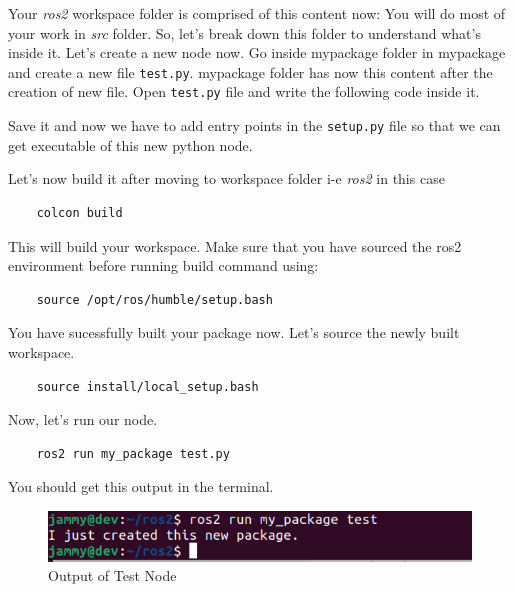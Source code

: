 \documentclass{article}
\begin{document}
Your \textit{ros2} workspace folder is comprised of this content now:
\vspace{12pt}
\vspace{12pt}
You will do most of your work in \textit{src} folder. So, let's break down this folder to understand what's inside it.
\vspace{12pt}
\vspace{12pt}
Let's create a new node now. Go inside my\textunderscore package folder in my\textunderscore package and create a new file \texttt{test.py}.
my\textunderscore package folder has now this content after the creation of new file.
\vspace{12pt}
\vspace{12pt}
Open \texttt{test.py} file and write the following code inside it.
\pagebreak

Save it and now we have to add entry points in the \texttt{setup.py} file so that we can get executable of this new python node.

Let's now build it after moving to workspace folder i-e \textit{ros2} in this case
\begin{verbatim}
    colcon build
\end{verbatim}
This will build your workspace. Make sure that you have sourced the ros2 environment before running build command using:
 \begin{verbatim}
    source /opt/ros/humble/setup.bash
\end{verbatim}
You have sucessfully built your package now. Let's source the newly built workspace.
\begin{verbatim}
    source install/local_setup.bash
\end{verbatim}
Now, let's run our node.
\begin{verbatim}
    ros2 run my_package test.py
\end{verbatim}
You should get this output in the terminal.
\begin{figure}[h]
    \includegraphics[width=12cm]{./data/images/pic1.png}
    \centering
    \caption{Output of Test Node}
\end{figure}
\end{document}
